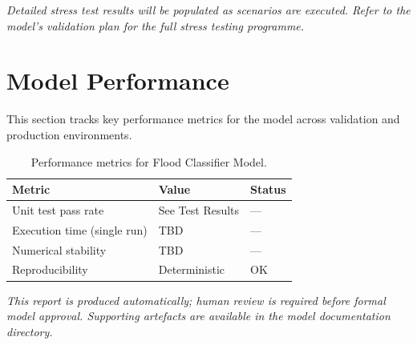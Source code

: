 \documentclass[11pt,a4paper]{article}
\begin{document}
\textit{Detailed stress test results will be populated as scenarios are executed.
Refer to the model's validation plan for the full stress testing programme.}

\section{Model Performance}

This section tracks key performance metrics for the model across
validation and production environments.

\begin{table}[H]
    \centering
    \caption{Performance metrics for Flood Classifier Model.}
    \begin{tabular}{lll}
        \toprule
        \textbf{Metric} & \textbf{Value} & \textbf{Status} \\
        \midrule
        Unit test pass rate & See Test Results & --- \\
        Execution time (single run) & TBD & --- \\
        Numerical stability & TBD & --- \\
        Reproducibility & Deterministic & OK \\
        \bottomrule
    \end{tabular}
\end{table}

\vspace{12pt}

\noindent\textit{\small This report is produced automatically; human review
is required before formal model approval. Supporting artefacts are available
in the model documentation directory.}
\end{document}
